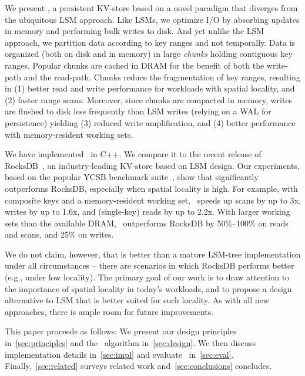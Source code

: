 We present \sys, a persistent KV-store based on a novel paradigm that diverges from the ubiquitous LSM approach.  
Like  LSMs,  we optimize I/O by absorbing updates in memory and performing bulk writes to disk. 
And yet unlike the LSM approach, we partition data according to key ranges and not temporally.
Data is  organized (both on disk and in memory) in large \emph{chunks} holding contiguous key ranges.
Popular chunks are cached in DRAM for the benefit of  both the write-path and the read-path.
Chunks reduce the fragmentation of key ranges, resulting in 
(1) better read and write performance for workloads with spatial locality,  and
(2) faster range scans. 
Moreover, since chunks  are compacted in memory, writes are 
flushed to disk less frequently than LSM writes (relying on a WAL for persistence)
yielding 
(3) reduced write amplification, and 
(4) better performance with memory-resident working sets.
 
We have implemented \sys\ in C++. We compare it to the recent release of RocksDB~\cite{RocksDB}, 
an industry-leading KV-store  based on LSM design. Our experiments, based on the popular 
YCSB benchmark suite~\cite{YCSB}, show that \sys\/ significantly outperforms  RocksDB, 
especially when spatial  locality is high. 
For example, with composite keys and a memory-resident working set, \sys\  speeds up scans 
by up to 3x, writes by up to 1.6x, and (single-key) reads by up to 2.2x.
With larger working sets than the available DRAM, \sys\ outperforms RocksDB by 50\%--100\% on reads  and 
scans, and 25\% on writes. 

We do not claim, however, that \sys\/ is better than a mature LSM-tree implementation
under all circumstances -- there are scenarios in which RocksDB performs better (e.g., under low locality). 
The primary goal of our work is to draw attention to the importance of spatial locality in 
today's workloads, and to propose a design alternative to LSM that is better suited for such locality. 
As with all new approaches, there is ample  room for 
future improvements. 
 
 This paper proceeds as follows:
We present our design principles in~\cref{sec:principles} and  the \sys\ algorithm 
in~\cref{sec:design}. We then discuss implementation details in~\cref{sec:impl} and evaluate 
\sys\ in~\cref{sec:eval}.  Finally,~\cref{sec:related}   surveys related work and~\cref{sec:conclusions}
concludes. 


